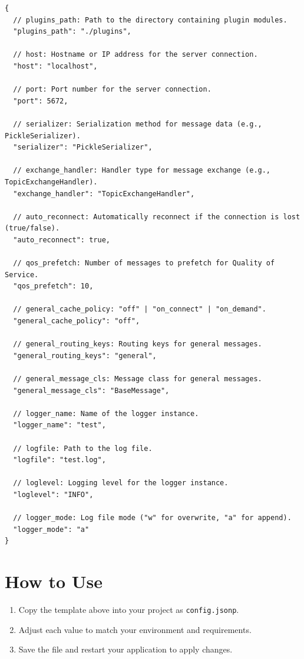 \begin{lstlisting}
{
  // plugins_path: Path to the directory containing plugin modules.
  "plugins_path": "./plugins",

  // host: Hostname or IP address for the server connection.
  "host": "localhost",

  // port: Port number for the server connection.
  "port": 5672,

  // serializer: Serialization method for message data (e.g., PickleSerializer).
  "serializer": "PickleSerializer",

  // exchange_handler: Handler type for message exchange (e.g., TopicExchangeHandler).
  "exchange_handler": "TopicExchangeHandler",

  // auto_reconnect: Automatically reconnect if the connection is lost (true/false).
  "auto_reconnect": true,

  // qos_prefetch: Number of messages to prefetch for Quality of Service.
  "qos_prefetch": 10,

  // general_cache_policy: "off" | "on_connect" | "on_demand".
  "general_cache_policy": "off",

  // general_routing_keys: Routing keys for general messages.
  "general_routing_keys": "general",

  // general_message_cls: Message class for general messages.
  "general_message_cls": "BaseMessage",

  // logger_name: Name of the logger instance.
  "logger_name": "test",

  // logfile: Path to the log file.
  "logfile": "test.log",

  // loglevel: Logging level for the logger instance.
  "loglevel": "INFO",

  // logger_mode: Log file mode ("w" for overwrite, "a" for append).
  "logger_mode": "a"
}
\end{lstlisting}

\vspace{1em}

\section*{How to Use}
\begin{enumerate}
  \item Copy the template above into your project as \texttt{config.jsonp}.
  \item Adjust each value to match your environment and requirements.
  \item Save the file and restart your application to apply changes.
\end{enumerate}

